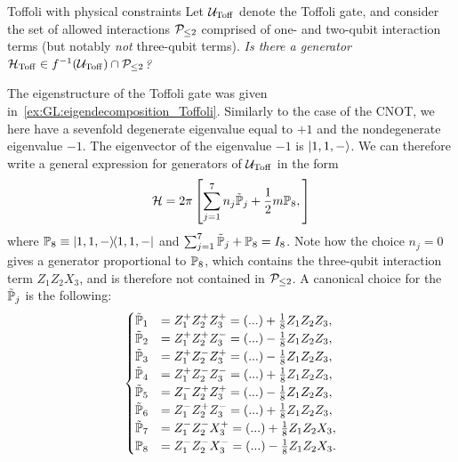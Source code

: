 \begin{examplebox}[label={ex:GL:toffoli_physical_constraints}]{Toffoli with physical constraints}
\fontsize{10pt}{10pt}\selectfont
Let ${\mathcal{U}}_{\operatorname{Toff}}$ denote the Toffoli gate, and consider the set of allowed interactions ${\mathcal{P}}_{\le2}$ comprised of one- and two-qubit interaction terms (but notably \textit{not} three-qubit terms).
\emph{\textit{Is there a generator ${\mathcal{H}}_{\operatorname{Toff}}\in f^{-1}({\mathcal{U}}_{\operatorname{Toff}})\cap{\mathcal{P}}_{\le2}$?}}

The eigenstructure of the Toffoli gate was given in~\cref{ex:GL:eigendecomposition_Toffoli}. Similarly to the case of the CNOT, we here have a sevenfold degenerate eigenvalue equal to $+1$ and the nondegenerate eigenvalue $-1$.
The eigenvector of the eigenvalue $-1$ is $\ket{1,1,-}$. We can therefore write a general expression for generators of ${\mathcal{U}}_{\operatorname{Toff}}$ in the form
\begin{equation}
    {\mathcal{H}}=2\pi \left[
        \sum_{j=1}^7 n_j \tilde{{\mathbb{P}}}_j
        +\frac12 m{\mathbb{P}}_8,
    \right]
\end{equation}
where ${\mathbb{P}}_8\equiv\ketbra{1,1,-}$ and $\sum_{j=1}^7\tilde{{\mathbb{P}}}_j+{\mathbb{P}}_8=I_8$.
Note how the choice $n_j=0$ gives a generator proportional to ${\mathbb{P}}_8$, which contains the three-qubit interaction term $Z_1 Z_2 X_3$, and is therefore not contained in ${\mathcal{P}}_{\le2}$.
A canonical choice for the $\tilde{{\mathbb{P}}}_j$ is the following:
\begin{equation}
\begin{cases}
    \tilde{{\mathbb{P}}}_1 &= Z_1^+ Z_2^+ Z_3^+ = (...) + \frac18 Z_1 Z_2 Z_3, \\
    \tilde{{\mathbb{P}}}_2 &= Z_1^+ Z_2^+ Z_3^- = (...) - \frac{1}{8} Z_1 Z_2 Z_3, \\
    \tilde{{\mathbb{P}}}_3 &= Z_1^+ Z_2^- Z_3^+ = (...) - \frac18 Z_1 Z_2 Z_3, \\
    \tilde{{\mathbb{P}}}_4 &= Z_1^+ Z_2^- Z_3^- = (...) + \frac18 Z_1 Z_2 Z_3, \\
    \tilde{{\mathbb{P}}}_5 &= Z_1^- Z_2^+ Z_3^+ = (...) - \frac18 Z_1 Z_2 Z_3, \\
    \tilde{{\mathbb{P}}}_6 &= Z_1^- Z_2^+ Z_3^- = (...) + \frac18 Z_1 Z_2 Z_3, \\
    \tilde{{\mathbb{P}}}_7 &= Z_1^- Z_2^- X_3^+ = (...) + \frac18 Z_1 Z_2 X_3, \\
    {\mathbb{P}}_8 &= Z_1^- Z_2^- X_3^- = (...) - \frac18 Z_1 Z_2 X_3.
\end{cases}
\end{equation}

\end{examplebox}
